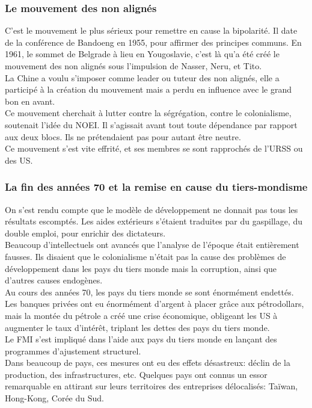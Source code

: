 \documentclass[10pt, a4paper, openany]{book}
\begin{document}
\subsubsection{Le mouvement des non alignés}

C'est le mouvement le plus sérieux pour remettre en cause la bipolarité. Il date de la conférence de Bandoeng en 1955, pour affirmer des principes communs. En 1961, le sommet de Belgrade à lieu en Yougoslavie, c'est là qu'a été créé le mouvement des non alignés sous l'impulsion de Nasser, Neru, et Tito. \\
La Chine a voulu s'imposer comme leader ou tuteur des non alignés, elle a participé à la création du mouvement mais a perdu en influence avec le grand bon en avant. \\
Ce mouvement cherchait à lutter contre la ségrégation, contre le colonialisme, soutenait l'idée du NOEI. Il s'agissait avant tout toute dépendance par rapport aux deux blocs. Ils ne prétendaient pas pour autant être neutre. \\
Ce mouvement s'est vite effrité, et ses membres se sont rapprochés de l'URSS ou des US. 

\subsubsection{La fin des années 70 et la remise en cause du tiers-mondisme}

On s'est rendu compte que le modèle de développement ne donnait pas tous les résultats escomptés. Les aides extérieurs s'étaient traduites par du gaspillage, du double emploi, pour enrichir des dictateurs. \\
Beaucoup d'intellectuels ont avancés que l'analyse de l'époque était entièrement fausses. Ils disaient que le colonialisme n'était pas la cause des problèmes de développement dans les pays du tiers monde mais la corruption, ainsi que d'autres causes endogènes. \\
Au cours des années 70, les pays du tiers monde se sont énormément endettés. Les banques privées ont eu énormément d'argent à placer grâce aux pétrodollars, mais la montée du pétrole a créé une crise économique, obligeant les US à augmenter le taux d'intérêt, triplant les dettes des pays du tiers monde. \\
Le FMI s'est impliqué dans l'aide aux pays du tiers monde en lançant des programmes d'ajustement structurel. \\
Dans beaucoup de pays, ces mesures ont eu des effets désastreux: déclin de la production, des infrastructures, etc. Quelques pays ont connus un essor remarquable en attirant sur leurs territoires des entreprises délocalisés: Taïwan, Hong-Kong, Corée du Sud. 
\end{document}
